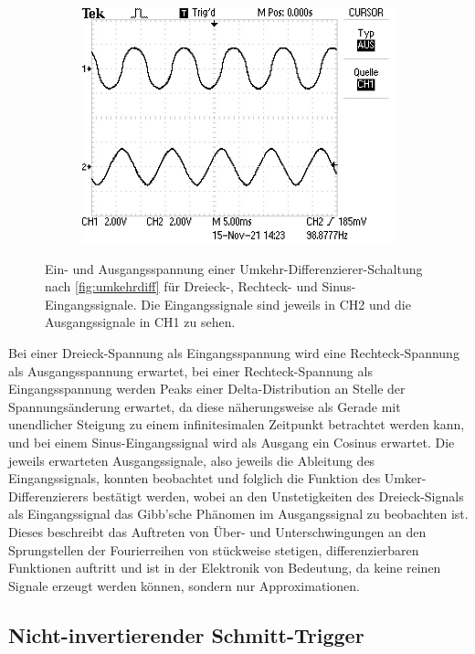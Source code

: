 \begin{figure}[H]
\begin{subfigure}{.496\textwidth}
    \includegraphics[width=\linewidth]{data/ALL0064/F0064TEK.JPG}
  \end{subfigure}
  \caption{Ein- und Ausgangsspannung einer Umkehr-Differenzierer-Schaltung nach \autoref{fig:umkehrdiff} für Dreieck-, Rechteck- und Sinus-Eingangssignale. Die Eingangssignale sind jeweils in CH2 und die Ausgangssignale in CH1 zu sehen.}
  \label{fig:diff_oszi}
\end{figure}


Bei einer Dreieck-Spannung als Eingangsspannung wird eine Rechteck-Spannung als Ausgangsspannung erwartet, bei einer Rechteck-Spannung als Eingangsspannung werden Peaks einer Delta-Distribution an Stelle der Spannungsänderung erwartet, da diese näherungsweise als Gerade mit unendlicher Steigung zu einem infinitesimalen Zeitpunkt betrachtet werden kann, und bei einem Sinus-Eingangssignal wird als Ausgang ein Cosinus erwartet. Die jeweils erwarteten Ausgangssignale, also jeweils die Ableitung des Eingangssignals, konnten beobachtet und folglich die Funktion des Umker-Differenzierers bestätigt werden, wobei an den Unstetigkeiten des Dreieck-Signals als Eingangssignal das Gibb'sche Phänomen im Ausgangssignal zu beobachten ist. Dieses beschreibt das Auftreten von Über- und Unterschwingungen an den Sprungstellen der Fourierreihen von stückweise stetigen, differenzierbaren Funktionen auftritt und ist in der Elektronik von Bedeutung, da keine reinen Signale erzeugt werden können, sondern nur Approximationen.

\newpage
\subsection{Nicht-invertierender Schmitt-Trigger}

